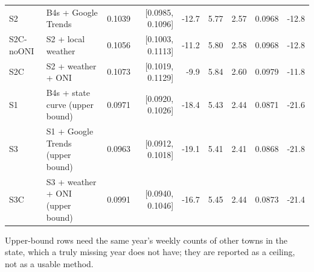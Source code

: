 \begin{table}[t]
{\begin{tabular}{llrrrrrrr}
S2 & B4s + Google Trends & 0.1039 & [0.0985, 0.1096] & -12.7 & 5.77 & 2.57 & 0.0968 & -12.8 \\
S2C-noONI & S2 + local weather & 0.1056 & [0.1003, 0.1113] & -11.2 & 5.80 & 2.58 & 0.0968 & -12.8 \\
S2C & S2 + weather + ONI & 0.1073 & [0.1019, 0.1129] & -9.9 & 5.84 & 2.60 & 0.0979 & -11.8 \\
\midrule
S1 & B4s + state curve (upper bound) & 0.0971 & [0.0920, 0.1026] & -18.4 & 5.43 & 2.44 & 0.0871 & -21.6 \\
S3 & S1 + Google Trends (upper bound) & 0.0963 & [0.0912, 0.1018] & -19.1 & 5.41 & 2.41 & 0.0868 & -21.8 \\
S3C & S3 + weather + ONI (upper bound) & 0.0991 & [0.0940, 0.1046] & -16.7 & 5.45 & 2.44 & 0.0873 & -21.4 \\
\bottomrule
\end{tabular}}
\par\vspace{2pt}\footnotesize Upper-bound rows need the same year's weekly counts of other towns in the state, which a truly missing year does not have; they are reported as a ceiling, not as a usable method.
\end{table}

